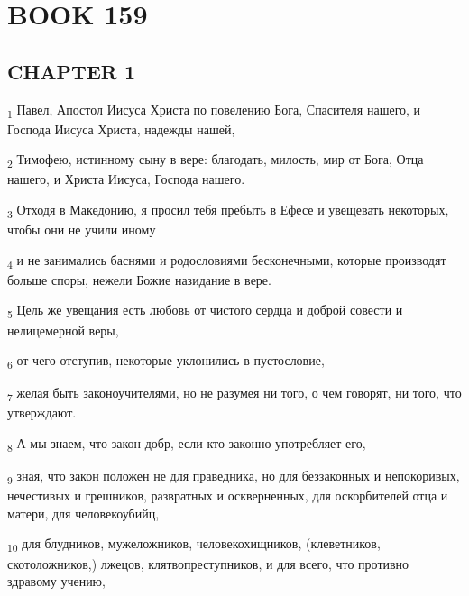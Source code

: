 \section{BOOK 159}
\subsection{CHAPTER 1}
\begin{tcolorbox}
\textsubscript{1} Павел, Апостол Иисуса Христа по повелению Бога, Спасителя нашего, и Господа Иисуса Христа, надежды нашей,
\end{tcolorbox}
\begin{tcolorbox}
\textsubscript{2} Тимофею, истинному сыну в вере: благодать, милость, мир от Бога, Отца нашего, и Христа Иисуса, Господа нашего.
\end{tcolorbox}
\begin{tcolorbox}
\textsubscript{3} Отходя в Македонию, я просил тебя пребыть в Ефесе и увещевать некоторых, чтобы они не учили иному
\end{tcolorbox}
\begin{tcolorbox}
\textsubscript{4} и не занимались баснями и родословиями бесконечными, которые производят больше споры, нежели Божие назидание в вере.
\end{tcolorbox}
\begin{tcolorbox}
\textsubscript{5} Цель же увещания есть любовь от чистого сердца и доброй совести и нелицемерной веры,
\end{tcolorbox}
\begin{tcolorbox}
\textsubscript{6} от чего отступив, некоторые уклонились в пустословие,
\end{tcolorbox}
\begin{tcolorbox}
\textsubscript{7} желая быть законоучителями, но не разумея ни того, о чем говорят, ни того, что утверждают.
\end{tcolorbox}
\begin{tcolorbox}
\textsubscript{8} А мы знаем, что закон добр, если кто законно употребляет его,
\end{tcolorbox}
\begin{tcolorbox}
\textsubscript{9} зная, что закон положен не для праведника, но для беззаконных и непокоривых, нечестивых и грешников, развратных и оскверненных, для оскорбителей отца и матери, для человекоубийц,
\end{tcolorbox}
\begin{tcolorbox}
\textsubscript{10} для блудников, мужеложников, человекохищников, (клеветников, скотоложников,) лжецов, клятвопреступников, и для всего, что противно здравому учению,
\end{tcolorbox}
